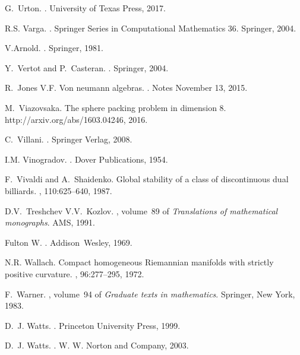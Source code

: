 \documentclass[12pt]{amsart}
\begin{document}
\begin{thebibliography}{100}
G.~Urton.
.
\newblock University of Texas Press, 2017.

R.S. Varga.
.
\newblock Springer Series in Computational Mathematics 36. Springer, 2004.

V.Arnold.
.
\newblock Springer, 1981.

Y.~Vertot and P.~Casteran.
.
\newblock Springer, 2004.

R.~Jones V.F.
\newblock Von neumann algebras.
.
\newblock Notes November 13, 2015.

M.~Viazovsaka.
\newblock The sphere packing problem in dimension 8.
\newblock http://arxiv.org/abs/1603.04246, 2016.

C.~Villani.
.
\newblock Springer Verlag, 2008.

I.M. Vinogradov.
.
\newblock Dover Publications, 1954.

F.~Vivaldi and A.~Shaidenko.
\newblock Global stability of a class of discontinuous dual billiards.
, 110:625--640, 1987.

D.V.~Treshchev V.V.~Kozlov.
, volume~89 of {\em Translations of mathematical
  monographs}.
\newblock AMS, 1991.

Fulton W.
.
\newblock Addison~Wesley, 1969.

N.R. Wallach.
\newblock Compact homogeneous {R}iemannian manifolds with strictly positive
  curvature.
, 96:277--295, 1972.

F.~Warner.
,
  volume~94 of {\em Graduate texts in mathematics}.
\newblock Springer, New York, 1983.

D.~J. Watts.
.
\newblock Princeton University Press, 1999.

D.~J. Watts.
.
\newblock W. W. Norton and Company, 2003.


\end{thebibliography}
\end{document}
